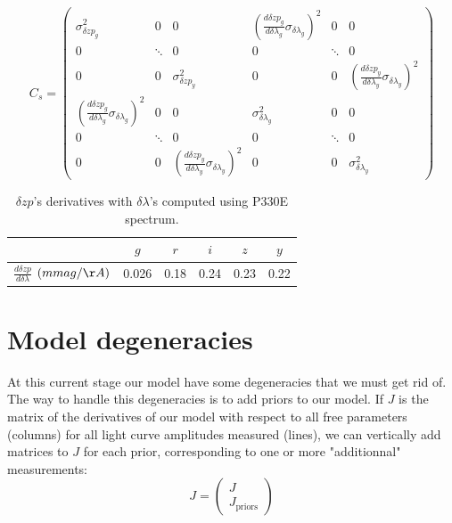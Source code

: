 \documentclass[\docopts]{\docclass}
\begin{document}
\begin{equation}
\label{eq::cov_calib}
C_s = 
\begin{pmatrix}
   \sigma^2_{\delta zp_{g}} & 0 & 0 & (\frac{d \delta zp_g}{d \delta \lambda_g} \sigma_{\delta \lambda_g})^2 & 0 & 0 \\
   0 & \ddots & 0 & 0 & \ddots & 0 \\
   0 & 0 & \sigma^2_{\delta zp_{y}} & 0 & 0 & (\frac{d \delta zp_y}{d \delta \lambda_y} \sigma_{\delta \lambda_y})^2 \\
   (\frac{d \delta zp_g}{d \delta \lambda_g} \sigma_{\delta \lambda_g})^2 & 0 & 0 & \sigma^2_{\delta\lambda_{g}} & 0 & 0 \\
   0 & \ddots & 0 & 0 & \ddots & 0 \\
   0 & 0 & (\frac{d \delta zp_y}{d \delta \lambda_y} \sigma_{\delta \lambda_y})^2 & 0 & 0 & \sigma^2_{\delta\lambda_{y}}
\end{pmatrix}
\end{equation}

\begin{table}[t]
\begin{center}
\caption{$\delta zp$'s derivatives with $\delta\lambda$'s computed using P330E spectrum.}
\label{tab::calib_derivatives}
\begin{tabular}{l|ccccc}
\hline
\hline
  & $g$ & $r$ & $i$ & $z$ & $y$ \\
\hline 
  $\frac{d \delta zp}{d \delta \lambda}$ $(mmag/\AA)$& 0.026 & 0.18 & 0.24 & 0.23 & 0.22\\
\hline
\end{tabular}
\end{center}
\end{table}


\section{Model degeneracies}
\label{sec::model_deg}

At this current stage our model have some degeneracies that we must get rid of.
The way to handle this degeneracies is to add priors to our model.
If $J$ is the matrix of the derivatives  of our model with respect to all free parameters (columns) for all light curve amplitudes measured (lines), we can vertically add matrices to $J$ for each prior, corresponding to one or more "additionnal" measurements:
\begin{equation}
J =
\begin{pmatrix}
  J \\
  J_\text{priors}
\end{pmatrix} 
\end{equation}
\end{document}
